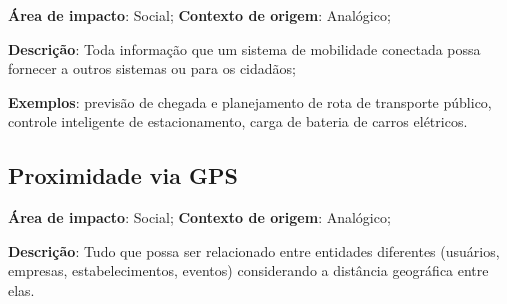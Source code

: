 \textbf{Área de impacto}: Social; \textbf{Contexto de origem}: Analógico;

\textbf{Descrição}: Toda informação que um sistema de mobilidade conectada possa fornecer a outros sistemas ou para os cidadãos;

\textbf{Exemplos}: previsão de chegada e planejamento de rota de transporte público, controle inteligente de estacionamento, carga de bateria de carros elétricos.

\subsection{Proximidade via GPS}

\textbf{Área de impacto}: Social; \textbf{Contexto de origem}: Analógico;

\textbf{Descrição}: Tudo que possa ser relacionado entre entidades diferentes (usuários, empresas, estabelecimentos, eventos) considerando a distância geográfica entre elas.